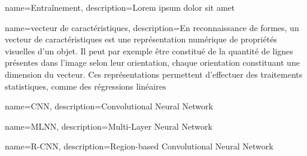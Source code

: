 \makeglossaries


{
  name={Entraînement},
	description={Lorem ipsum dolor sit amet}
}

{
  name={vecteur de caractéristiques},
	description={En reconnaissance de formes, un vecteur de caractéristiques est une représentation numérique de
	propriétés visuelles d'un objet. Il peut par exemple être constitué de la quantité de lignes présentes dans
	l'image selon leur orientation, chaque orientation constituant une dimension du vecteur. Ces représentations
	permettent d'effectuer des traitements statistiques, comme des régressions linéaires}
}

{
  name={CNN},
	description={Convolutional Neural Network}
}

{
  name={MLNN},
	description={Multi-Layer Neural Network}
}


{
  name={R-CNN},
	description={Region-based Convolutional Neural Network}
}
